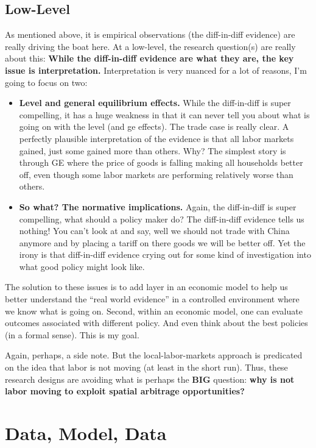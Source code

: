 \documentclass[pdftex,12pt]{article}
\begin{document}
\subsection{Low-Level}

As mentioned above, it is empirical observations (the diff-in-diff evidence) are really driving the boat here. At a low-level, the research question(s) are really about this: \textbf{While the diff-in-diff evidence are what they are, the key issue is interpretation.} Interpretation is very nuanced for a lot of reasons, I'm going to focus on two:
\begin{itemize}
\item \textbf{Level and general equilibrium effects.} While the diff-in-diff is super compelling, it has a huge weakness in that it can never tell you about what is going on with the level (and ge effects). The trade case is really clear. A perfectly plausible interpretation of the \citet{david2013china} evidence is that all labor markets gained, just some gained more than others. Why? The simplest story is through GE where the price of goods is falling making all households better off, even though some labor markets are performing relatively worse than others.

\item \textbf{So what? The normative implications.} Again, the diff-in-diff is super compelling, what should a policy maker do? The diff-in-diff evidence tells us nothing! You can't look at \citet{david2013china} and say, well we should not trade with China anymore and by placing a tariff on there goods we will be better off. Yet the irony is that diff-in-diff evidence crying out for some kind of investigation into what good policy might look like.
\end{itemize}
The solution to these issues is to add layer in an economic model to help us better understand the ``real world evidence'' in a controlled environment where we know what is going on. Second, within an economic model, one can evaluate outcomes associated with different policy. And even think about the best policies (in a formal sense). This is my goal.

\medskip
\noindent Again, perhaps, a side note. But the local-labor-markets approach is predicated on the idea that labor is not moving (at least in the short run). Thus, these research designs are avoiding what is perhaps the \textbf{BIG} question: \textbf{why is not labor moving to exploit spatial arbitrage opportunities?}

\section{Data, Model, Data}
\end{document}
